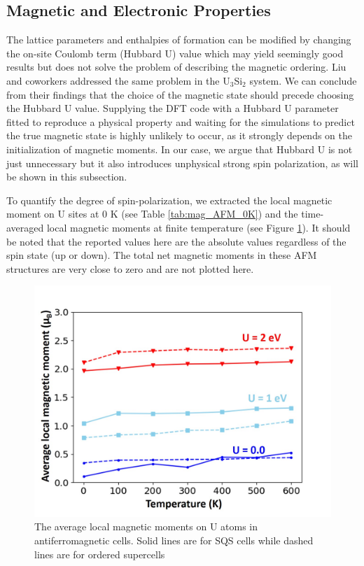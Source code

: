 \documentclass[preprint,12pt]{elsarticle}
\begin{document}
\FloatBarrier

\subsection{Magnetic and Electronic Properties}

The lattice parameters and enthalpies of formation can be modified by changing the on-site Coulomb term (Hubbard U) value which may yield seemingly good results but does not solve the problem of describing the magnetic ordering. Liu and coworkers \cite{liu_choosing_2019} addressed the same problem in the U$_3$Si$_2$ system. We can conclude from their findings that the choice of the magnetic state should precede choosing the Hubbard U value. Supplying the DFT code with a Hubbard U parameter fitted to reproduce a physical property and waiting for the simulations to predict the true magnetic state is highly unlikely to occur, as it strongly depends on the initialization of magnetic moments. In our case, we argue that Hubbard U is not just unnecessary but it also introduces unphysical strong spin polarization, as will be shown in this subsection.

To quantify the degree of spin-polarization, we extracted the local magnetic moment on U sites at 0 K (see Table \ref{tab:mag_AFM_0K}) and the time-averaged local magnetic moments at finite temperature (see Figure \ref{fig:4}). It should be noted that the reported values here are the absolute values regardless of the spin state (up or down). The total net magnetic moments in these AFM structures are very close to zero and are not plotted here.

\begin{figure}[h!]
    \centering
    \includegraphics[scale=0.5]{magmom.jpg}
    \caption{The average local magnetic moments on U atoms in antiferromagnetic cells. Solid lines are for SQS cells while dashed lines are for ordered supercells}
    \label{fig:4}
\end{figure}
\end{document}
